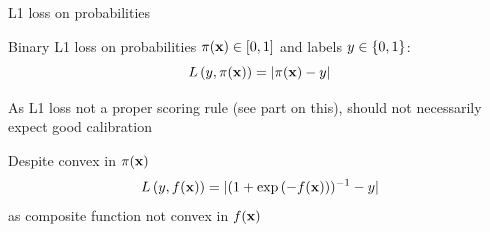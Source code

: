 \documentclass[11pt,compress,t,notes=noshow, xcolor=table]{beamer}
\begin{document}
\begin{framei}[sep=M]{L1 loss on probabilities}

\item Binary L1 loss on probabilities $\pi(\mathbf{x}) \in [0, 1]$ and labels $y \in \{0, 1\}$: $$L\left(y, \pi(\mathbf{x})\right) = |\pi(\mathbf{x}) - y|$$
\item As L1 loss not a proper scoring rule (see part on this), should not necessarily expect good calibration
\item Despite convex in $\pi(\mathbf{x})$ $$L\left(y, f(\mathbf{x})\right)=|(1+\exp{(-f(\mathbf{x}))})^{-1}-y|$$ as composite function not convex in $f(\mathbf{x})$ 

\vfill


\end{framei}



\endlecture
\end{document}
